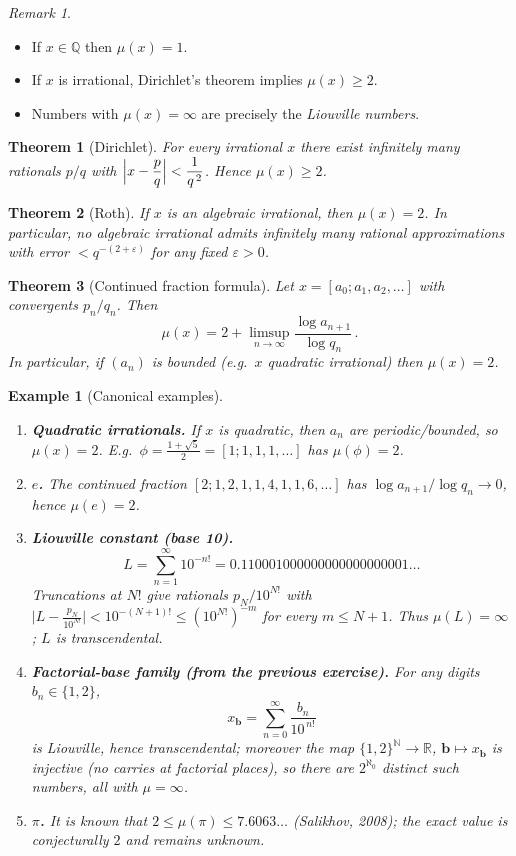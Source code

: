 \documentclass[11pt,a4paper]{article}
\newtheorem{theorem}{Theorem}
\newtheorem{example}{Example}
\theoremstyle{definition}
\theoremstyle{definition}
\theoremstyle{plain}
\theoremstyle{remark}
\newtheorem{remark}[exercise]{Remark}
\begin{document}
\begin{remark}
	\hfill
	\begin{itemize}
		\item If $x\in\mathbb Q$ then $\mu(x)=1$.
		\item If $x$ is irrational, Dirichlet's theorem implies $\mu(x)\ge 2$.
		\item Numbers with $\mu(x)=\infty$ are precisely the \emph{Liouville numbers}.
	\end{itemize}
\end{remark}

\begin{theorem}[Dirichlet]
	For every irrational $x$ there exist infinitely many rationals $p/q$ with
	$\displaystyle \Bigl|x-\frac{p}{q}\Bigr|<\frac{1}{q^{\,2}}$. Hence $\mu(x)\ge2$.
\end{theorem}

\begin{theorem}[Roth]
	If $x$ is an algebraic irrational, then $\mu(x)=2$. In particular,
	no algebraic irrational admits infinitely many rational approximations
	with error $<q^{-(2+\varepsilon)}$ for any fixed $\varepsilon>0$.
\end{theorem}

\begin{theorem}[Continued fraction formula]
	Let $x=[a_0;a_1,a_2,\dots]$ with convergents $p_n/q_n$.
	Then
	\[
	\boxed{\qquad
		\mu(x)=2+\limsup_{n\to\infty}\frac{\log a_{n+1}}{\log q_n}\,.
		\qquad}
	\]
	In particular, if $(a_n)$ is bounded (e.g.\ $x$ quadratic irrational) then $\mu(x)=2$.
\end{theorem}

\begin{example}[Canonical examples]
	\hfill
	\begin{enumerate}
		\item \textbf{Quadratic irrationals.} If $x$ is quadratic, then $a_n$ are periodic/bounded,
		so $\mu(x)=2$. E.g.\ $\phi=\frac{1+\sqrt5}{2}=[1;1,1,1,\dots]$ has $\mu(\phi)=2$.
		\item \textbf{$e$.} The continued fraction $[2;1,2,1,1,4,1,1,6,\dots]$ has
		$\log a_{n+1}/\log q_n\to0$, hence $\mu(e)=2$.
		\item \textbf{Liouville constant (base 10).}
		\[
		L=\sum_{n=1}^\infty 10^{-n!}=0.110001000000000000000001\ldots
		\]
		Truncations at $N!$ give rationals $p_N/10^{N!}$ with
		$\bigl|L-\frac{p_N}{10^{N!}}\bigr|<10^{-(N+1)!}\le (10^{N!})^{-m}$ for every $m\le N+1$.
		Thus $\mu(L)=\infty$; $L$ is transcendental.
		\item \textbf{Factorial-base family (from the previous exercise).}
		For any digits $b_n\in\{1,2\}$,
		\[
		x_{\mathbf b}=\sum_{n=0}^\infty \frac{b_n}{10^{\,n!}}
		\]
		is Liouville, hence transcendental; moreover the map $\{1,2\}^{\mathbb N}\to\mathbb R$,
		$\mathbf b\mapsto x_{\mathbf b}$ is injective (no carries at factorial places), so there are
		$2^{\aleph_0}$ distinct such numbers, all with $\mu=\infty$.
		\item \textbf{$\pi$.} It is known that $2\le \mu(\pi)\le 7.6063\ldots$ (Salikhov, 2008);
		the exact value is conjecturally $2$ and remains unknown.
	\end{enumerate}
\end{example}
\end{document}
